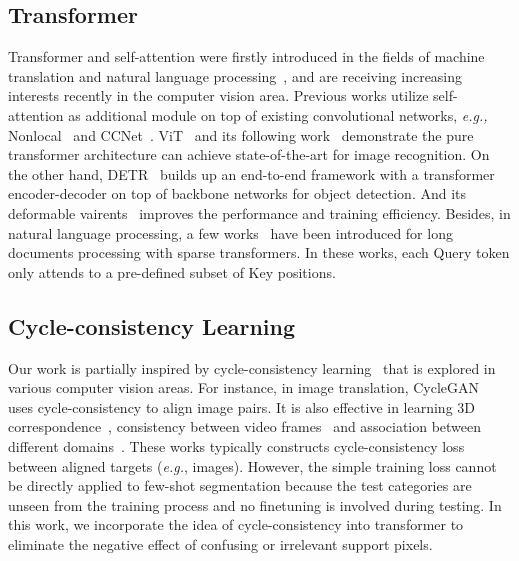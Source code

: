 \documentclass{article}
\begin{document}
\subsection{Transformer}
Transformer and self-attention were firstly introduced in the fields of machine translation and natural language processing~\cite{devlin2018bert,vaswani2017transformer}, and are receiving increasing interests recently in the computer vision area. Previous works utilize self-attention as additional module on top of existing convolutional networks, \textit{e.g., }Nonlocal~\cite{wang2018nonlocal} and CCNet~\cite{huang2019ccnet}. ViT~\cite{dosovitskiy2020vit} and its following work~\cite{touvron2020deit} demonstrate the pure transformer architecture can achieve state-of-the-art for image recognition. On the other hand, DETR~\cite{carion2020detr} builds up an end-to-end framework with a transformer encoder-decoder on top of backbone networks for object detection. And its deformable vairents~\cite{zhu2020deformabledetr} improves the performance and training efficiency.  
Besides, in natural language processing, a few works~\cite{beltagy2020longformer,child2019generating,shi2021sparsebert} have been introduced for long documents processing with sparse transformers. In these works, each Query token only attends to a pre-defined subset of Key positions.



\subsection{Cycle-consistency Learning}
Our work is partially inspired by cycle-consistency learning~\cite{zhu2017cyclegan,dwibedi2019temporalCYC} that is explored in various computer vision areas. For instance, in image translation, CycleGAN~\cite{zhu2017cyclegan} uses cycle-consistency to align image pairs. It is also effective in learning 3D correspondence~\cite{zhou2016corr3Dlearning}, consistency between video frames~\cite{wang2019timecycle} and association between different domains~\cite{kang2020pixelcycle}. These works typically constructs cycle-consistency loss between aligned targets (\textit{e.g.}, images). However, the simple training loss cannot be directly applied to few-shot segmentation because the test categories are unseen from the training process and no finetuning is involved during testing. In this work, we incorporate the idea of cycle-consistency into transformer to eliminate the negative effect of confusing or irrelevant support pixels.
 
\end{document}
